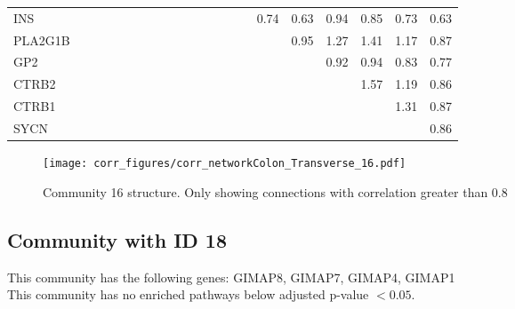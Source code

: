 \begin{longtable}{lrrrrrrrrrrrrrrrrrrrr}
INS      &              &              &              &              &             &            &            &            &            &             &           &             &                &           &          0.74 &      0.63 &        0.94 &        0.85 &       0.73 &        0.63 \\
PLA2G1B  &              &              &              &              &             &            &            &            &            &             &           &             &                &           &               &      0.95 &        1.27 &        1.41 &       1.17 &        0.87 \\
GP2      &              &              &              &              &             &            &            &            &            &             &           &             &                &           &               &           &        0.92 &        0.94 &       0.83 &        0.77 \\
CTRB2    &              &              &              &              &             &            &            &            &            &             &           &             &                &           &               &           &             &        1.57 &       1.19 &        0.86 \\
CTRB1    &              &              &              &              &             &            &            &            &            &             &           &             &                &           &               &           &             &             &       1.31 &        0.87 \\
SYCN     &              &              &              &              &             &            &            &            &            &             &           &             &                &           &               &           &             &             &            &        0.86 \\
\end{longtable}


\begin{figure}[h!]
\centering
\texttt{[image: corr\_figures/corr\_networkColon\_Transverse\_16.pdf]}
\caption{Community 16 structure. Only showing connections with correlation greater than 0.8}
\end{figure}




\subsection*{Community with ID 18}
This community has the following genes: GIMAP8, GIMAP7, GIMAP4, GIMAP1
\\
This community has no enriched pathways below adjusted p-value $< 0.05$.

